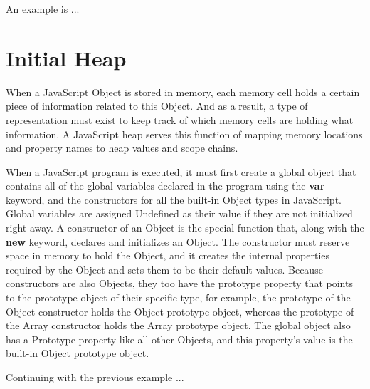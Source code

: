 \documentclass[a4paper,11pt,twoside]{report}
\begin{document}
An example is ... %


\section{Initial Heap}
When a JavaScript Object is stored in memory, each memory cell holds a certain piece of information related to this Object. And as a result, a type of representation must exist to keep track of which memory cells are holding what information. A JavaScript heap serves this function of mapping memory locations and property names to heap values and scope chains. %

When a JavaScript program is executed, it must first create a global object that contains all of the global variables declared in the program using the \textbf{var} keyword, and the constructors for all the built-in Object types in JavaScript. Global variables are assigned Undefined as their value if they are not initialized right away. A constructor of an Object is the special function that, along with the \textbf{new} keyword, declares and initializes an Object. The constructor must reserve space in memory to hold the Object, and it creates the internal properties required by the Object and sets them to be their default values. Because constructors are also Objects, they too have the prototype property that points to the prototype object of their specific type, for example, the prototype of the Object constructor holds the Object prototype object, whereas the prototype of the Array constructor holds the Array prototype object. The global object also has a Prototype property like all other Objects, and this property's value is the built-in Object prototype object. 

Continuing with the previous example ... %

\end{document}
